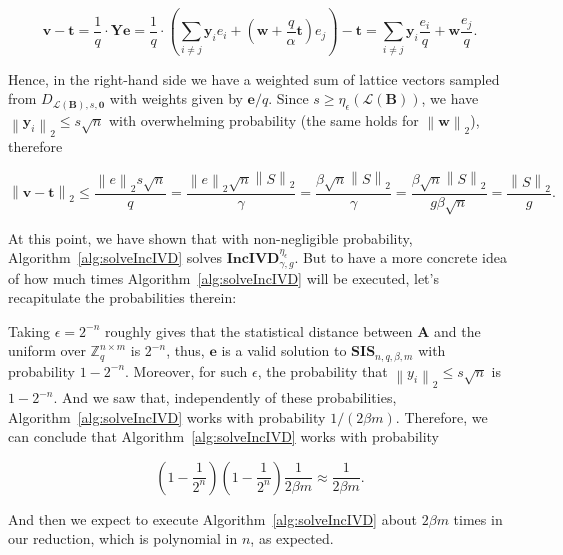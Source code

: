 \documentclass[a4paper,11pt]{article}
\let\vec\mathbf %
\newcommand\Zqnm{{\mathbb Z}_q^{n\times m}}
\newcommand\A{{\mathbf A}}
\newcommand\LB{\mathcal{L}\left(\vec B\right)}
\newcommand\DLs[1]{D_{\LB, s, #1}}
\newcommand\smooth{\eta_\epsilon}
\newcommand\SIS{\textbf{SIS}_{n, q, \beta, m}}
\newcommand\incIVD{\textbf{IncIVD}_{\gamma, g}^{\smooth}}
\newcommand{\norm}[1]{\left\lVert #1 \right\rVert_2}
\theoremstyle{definition}
\theoremstyle{remark}
\begin{document}
$$\vec v - \vec t =  \frac{1}{q} \cdot \vec Y \vec e = \frac{1}{q} \cdot \left( 
\sum_{i\not=j}\vec y_ie_i + \left(\vec{w} + \frac{q}{\alpha}\vec t\right) e_j 
\right) - \vec t = \sum_{i\not=j}\vec y_i\frac{e_i}{q} + \vec{w}\frac{e_j}{q}.$$

Hence, in the right-hand side we have a weighted sum of lattice vectors sampled 
from $\DLs{\vec 0}$ with weights given by $\vec e / q$. Since $s \ge 
\smooth(\LB)$, we have $\norm{\vec y_i} \le s\sqrt{n}$ with overwhelming 
probability (the same holds for $\norm{\vec w}$), therefore

$$\norm{\vec v - \vec t} \le \frac{\norm{e}s\sqrt{n}}{q} =  
\frac{\norm{e}\sqrt{n}\norm{S}}{\gamma} = \frac{\beta\sqrt{n}\norm{S}}{\gamma} 
= \frac{\beta\sqrt{n}\norm{S}}{g \beta \sqrt{n}} = \frac{\norm{S}}{g}.$$

At this point, we have shown that with non-negligible probability, 
Algorithm~\ref{alg:solveIncIVD} solves $\incIVD$. But to have a more concrete 
idea of how much times Algorithm~\ref{alg:solveIncIVD} will be executed, let's 
recapitulate the probabilities therein:

Taking $\epsilon = 2^{-n}$ roughly gives that the statistical distance between 
$\A$ and the uniform over $\Zqnm$ is $2^{-n}$, thus, $\vec e$ is a valid 
solution to $\SIS$ with probability $1 - 2^{-n}$. Moreover, for such 
$\epsilon$, the probability that $\norm{y_i} \le s\sqrt{n}$ is $1-2^{-n}$. And 
we saw that, independently of these probabilities, 
Algorithm~\ref{alg:solveIncIVD} works with probability $1/(2\beta m)$. 
Therefore, we can conclude that Algorithm~\ref{alg:solveIncIVD} works with 
probability 

$$\left(1-\frac{1}{2^n}\right)\left(1-\frac{1}{2^n}\right)\frac{1}{2\beta m} 
\approx \frac{1}{2\beta m}.$$

And then we expect to execute Algorithm~\ref{alg:solveIncIVD} about $2\beta m$ 
times in our reduction, which is polynomial in $n$, as expected.




\end{document}
